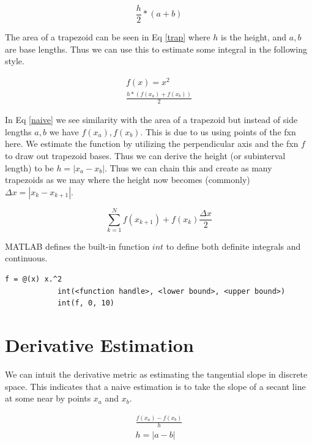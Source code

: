\documentclass[12pt]{article}
\begin{document}
		\begin{equation} \label{trap}
			\frac{h}{2} * (a + b)
		\end{equation}

		The area of a trapezoid can be seen in Eq \eqref{trap} where $h$ is the height,
			and $a,b$ are base lengths.
		Thus we can use this to estimate some integral in the following style.

		\begin{equation} \label{naive}
			\begin{split}
				f(x) = x^2 \\
				\frac{h*(f(x_a) + f(x_{b}))}{2}
			\end{split}
		\end{equation}

		In Eq \eqref{naive} we see similarity with the area of a trapezoid but instead of side lengths $a,b$ we have $f(x_a), f(x_b)$.
		This is due to us using points of the fxn here.
		We estimate the function by utilizing the perpendicular axis and the fxn $f$ to draw out trapezoid bases.
		Thus we can derive the height (or subinterval length) to be $h = |x_a - x_b|$.
		Thus we can chain this and create as many trapezoids as we may where the height now becomes (commonly) $\Delta x = |x_k - x_{k+1}|$.

		\begin{equation}
			\sum^N_{k=1} f(x_{k+1}) + f(x_k) \frac{\Delta x}{2}
		\end{equation}

		MATLAB defines the built-in function $int$ to define both definite integrals and continuous.

		\begin{lstlisting}[style=pseudocode]
			f = @(x) x.^2
			int(<function handle>, <lower bound>, <upper bound>)
			int(f, 0, 10)
		\end{lstlisting}

	\section{Derivative Estimation}
		We can intuit the derivative metric as estimating the tangential slope in discrete space.
		This indicates that a naive estimation is to take the slope of a secant line at some near by points $x_a$ and $x_b$.

		\begin{equation}
			\begin{split}
				\frac{f(x_a) - f(x_b)}{h} \\
				h = |a - b|
			\end{split}
		\end{equation}
\end{document}
